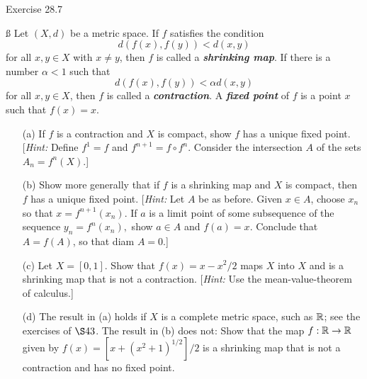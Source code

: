 \documentclass{hmwk}
\begin{document}
\begin{problem}{Exercise 28.7}

    \ss
    \noindent Let $(X, d)$ be a metric space. If $f$ satisfies the condition $$d(f(x), f(y)) < d(x, y)$$ for all $x, y \in X$ with $x \neq y$, then $f$ is called a \textit{\textbf{shrinking map}}. If there is a number $\alpha < 1$ such that $$d(f(x), f(y)) < \alpha d(x, y)$$ for all $x, y \in X$, then $f$ is called a \textit{\textbf{contraction}}. A \textit{\textbf{fixed point}} of $f$ is a point $x$ such that $f(x) = x$.
    \begin{itemize}
        \item[(a)] If $f$ is a contraction and $X$ is compact, show $f$ has a unique fixed point. [\textit{Hint:} Define $f^1 = f$ and $f^{n+1} = f \circ f^n$. Consider the intersection $A$ of the sets $A_n = f^n(X)$.]
        \item[(b)] Show more generally that if $f$ is a shrinking map and $X$ is compact, then $f$ has a unique fixed point. [\textit{Hint:} Let $A$ be as before. Given $x \in A$, choose $x_n$ so that $x = f^{n+1}(x_n)$. If $a$ is a limit point of some subsequence of the sequence $y_n = f^n(x_n),$ show $a \in A$ and $f(a) = x$. Conclude that $A = f(A)$, so that diam $A = 0$.]
        \item[(c)] Let $X = [0, 1]$. Show that $f(x) = x - x^2/2$ maps $X$ into $X$ and is a shrinking map that is not a contraction. [\textit{Hint:} Use the mean-value-theorem of calculus.]
        \item[(d)] The result in (a) holds if $X$ is a complete metric space, such as $\mathbb{R}$; see the exercises of $\S 43$. The result in (b) does not: Show that the map $f: \mathbb{R} \rightarrow \mathbb{R}$ given by $f(x) = [x + (x^2 + 1)^{1/2}]/2$ is a shrinking map that is not a contraction and has no fixed point. 
    \end{itemize}
\end{problem}
\end{document}

